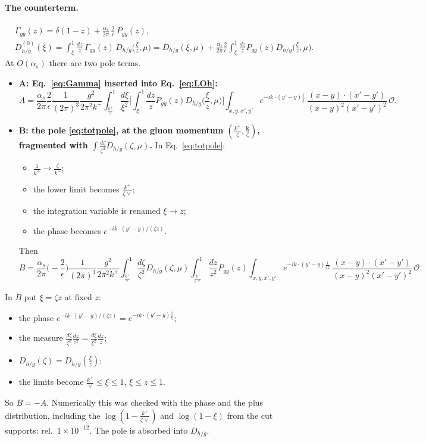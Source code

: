 \documentclass[10pt]{article}
\numberwithin{equation}{section}
\newcommand{\OO}{\mathcal O}
\newcommand{\preLO}{\frac{1}{(2\pi)^3}\frac{g^2}{2\pi^2k^+}}
\newcommand{\XX}{\frac{(x-y)\cdot(x'-y')}{(x-y)^{2}(x'-y')^{2}}}
\newcommand{\ph}{e^{-ik\cdot(y'-y)\frac{1}{\xi}}}
\begin{document}
\paragraph{The counterterm.}
\begin{equation}
\boxed{\begin{aligned}&\Gamma_{gg}(z)=\delta(1-z)+\frac{\alpha_s}{2\pi}\,\frac{2}{\epsilon}\,P_{gg}(z),\\
&D^{(0)}_{h/g}(\xi)=\int_\xi^1\frac{dz}{z}\,\Gamma_{gg}(z)\,D_{h/g}\Big(\frac{\xi}{z},\mu\Big)=D_{h/g}(\xi,\mu)+\frac{\alpha_s}{2\pi}\frac{2}{\epsilon}\int_\xi^1\frac{dz}{z}P_{gg}(z)D_{h/g}\Big(\frac{\xi}{z},\mu\Big).\end{aligned}}
\label{eq:Gamma}
\end{equation}
At $O(\alpha_s)$ there are two pole terms.
\begin{itemize}
\item \textbf{A: Eq.~\eqref{eq:Gamma} inserted into Eq.~\eqref{eq:LOh}:}
\begin{equation*}
A=\frac{\alpha_s}{2\pi}\frac{2}{\epsilon}\preLO\int_{\frac{k^+}{\vee}}^1\frac{d\xi}{\xi^2}\Big[\int_\xi^1\frac{dz}{z}P_{gg}(z)D_{h/g}\Big(\frac{\xi}{z},\mu\Big)\Big]\int_{x,y,x',y'}\ph\,\XX\,\OO .
\end{equation*}
\item \textbf{B: the pole \eqref{eq:totpole}, at the gluon momentum $(\frac{k^+}{\zeta},\frac{\mathbf k}{\zeta})$, fragmented with $\int\frac{d\zeta}{\zeta^3}D_{h/g}(\zeta,\mu)$.} In Eq.~\eqref{eq:totpole}:
\begin{itemize}
\item $\frac{1}{k^+}\to\frac{\zeta}{k^+}$;
\item the lower limit becomes $\frac{k^+}{\zeta\vee}$;
\item the integration variable is renamed $\xi\to z$;
\item the phase becomes $e^{-ik\cdot(y'-y)/(\zeta z)}$.
\end{itemize}
Then
\begin{equation*}
B=\frac{\alpha_s}{2\pi}\Big(-\frac{2}{\epsilon}\Big)\preLO\int_{\frac{k^+}{\vee}}^1\frac{d\zeta}{\zeta^2}D_{h/g}(\zeta,\mu)\int_{\frac{k^+}{\zeta\vee}}^1\frac{dz}{z^2}P_{gg}(z)\int_{x,y,x',y'}e^{-ik\cdot(y'-y)\frac{1}{\zeta z}}\,\XX\,\OO .
\end{equation*}
\end{itemize}
In $B$ put $\xi=\zeta z$ at fixed $z$:
\begin{itemize}
\item the phase $e^{-ik\cdot(y'-y)/(\zeta z)}=\ph$;
\item the measure $\frac{d\zeta}{\zeta^2}\frac{dz}{z^2}=\frac{d\xi}{\xi^2}\frac{dz}{z}$;
\item $D_{h/g}(\zeta)=D_{h/g}(\frac{\xi}{z})$;
\item the limits become $\frac{k^+}{\vee}\le\xi\le1$, $\xi\le z\le1$.
\end{itemize}
So $B=-A$. Numerically this was checked with the phase and the plus distribution, including the $\log(1-\frac{k^+}{\zeta\vee})$ and $\log(1-\xi)$ from the cut supports: rel.\ $1\times10^{-12}$. The pole is absorbed into $D_{h/g}$.
\end{document}
